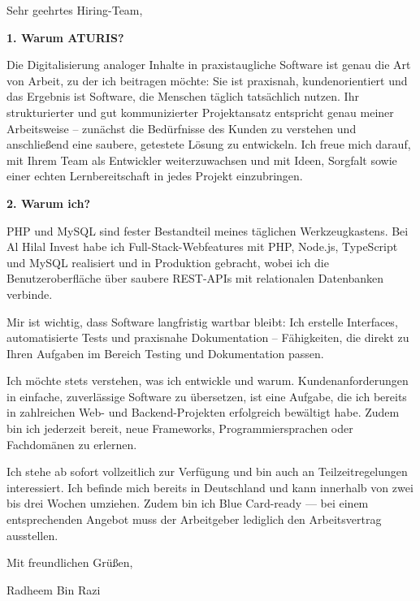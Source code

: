 \documentclass[11pt,a4paper]{coverletter}
\begin{document}
\opening{Sehr geehrtes Hiring-Team,}

\vspace{8pt}\noindent\textbf{1. Warum ATURIS?}\par\vspace{3pt}

Die Digitalisierung analoger Inhalte in praxistaugliche Software ist genau die Art von Arbeit, zu der ich beitragen möchte: Sie ist praxisnah, kundenorientiert und das Ergebnis ist Software, die Menschen täglich tatsächlich nutzen. Ihr strukturierter und gut kommunizierter Projektansatz entspricht genau meiner Arbeitsweise – zunächst die Bedürfnisse des Kunden zu verstehen und anschließend eine saubere, getestete Lösung zu entwickeln. Ich freue mich darauf, mit Ihrem Team als Entwickler weiterzuwachsen und mit Ideen, Sorgfalt sowie einer echten Lernbereitschaft in jedes Projekt einzubringen.

\vspace{8pt}\noindent\textbf{2. Warum ich?}\par\vspace{3pt}

\bullets

  \item PHP und MySQL sind fester Bestandteil meines täglichen Werkzeugkastens. Bei Al Hilal Invest habe ich Full-Stack-Webfeatures mit PHP, Node.js, TypeScript und MySQL realisiert und in Produktion gebracht, wobei ich die Benutzeroberfläche über saubere REST-APIs mit relationalen Datenbanken verbinde.

  \item Mir ist wichtig, dass Software langfristig wartbar bleibt: Ich erstelle Interfaces, automatisierte Tests und praxisnahe Dokumentation – Fähigkeiten, die direkt zu Ihren Aufgaben im Bereich Testing und Dokumentation passen.

  \item Ich möchte stets verstehen, was ich entwickle und warum. Kundenanforderungen in einfache, zuverlässige Software zu übersetzen, ist eine Aufgabe, die ich bereits in zahlreichen Web- und Backend-Projekten erfolgreich bewältigt habe. Zudem bin ich jederzeit bereit, neue Frameworks, Programmiersprachen oder Fachdomänen zu erlernen.

\bulletsend

Ich stehe ab sofort vollzeitlich zur Verfügung und bin auch an Teilzeitregelungen interessiert. Ich befinde mich bereits in Deutschland und kann innerhalb von zwei bis drei Wochen umziehen. Zudem bin ich Blue Card-ready — bei einem entsprechenden Angebot muss der Arbeitgeber lediglich den Arbeitsvertrag ausstellen.

\closing{Mit freundlichen Grüßen,}{Radheem Bin Razi}
\end{document}
